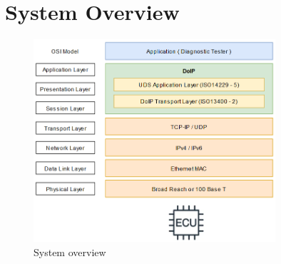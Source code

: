 %



%
\section{System Overview}

\begin{figure}[htbp]
    \centering
    \includegraphics[width=0.8\textwidth]{./pictures/systems-overview.png}
    \caption{System overview}
    \label{fig:2.2}
\end{figure}


